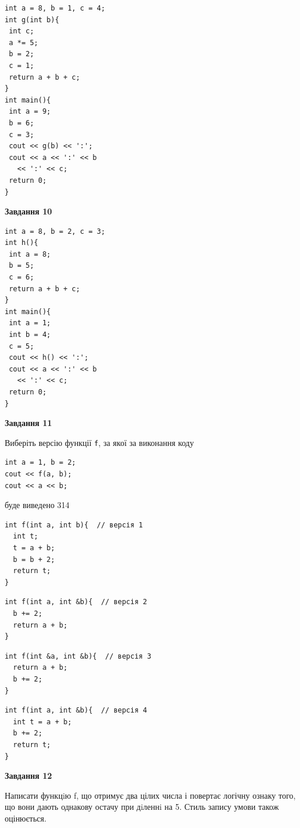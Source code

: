 \documentclass[12pt, ukrainian]{article}
\def\code#1{\Verb!#1!}
\begin{document}
{\begin {large}
\begin{minipage}[t]{7.0cm}
\begin{verbatim}
int a = 8, b = 1, c = 4;
int g(int b){
 int c;
 a *= 5;
 b = 2;
 c = 1;
 return a + b + c;
}
int main(){
 int a = 9;
 b = 6;
 c = 3;
 cout << g(b) << ':';
 cout << a << ':' << b 
   << ':' << c;
 return 0;
}
\end{verbatim}



\begin{center}
\textbf{Завдання 10}
\end{center}
\vspace{-8mm}

\begin{verbatim}
int a = 8, b = 2, c = 3;
int h(){
 int a = 8;
 b = 5;
 c = 6;
 return a + b + c;
}
int main(){
 int a = 1;
 int b = 4;
 c = 5;
 cout << h() << ':';
 cout << a << ':' << b 
   << ':' << c;
 return 0;
}
\end{verbatim}

\end{minipage}
\vline \hspace{1mm}
\begin{minipage}[t]{11.0cm}

\begin{center}
\textbf{Завдання 11}
\end{center}
Виберіть версію функції \code{f}, за якої за виконання коду
\begin{verbatim}
int a = 1, b = 2;
cout << f(a, b);
cout << a << b;
\end{verbatim}

буде виведено 314

\begin{verbatim}
int f(int a, int b){  // версія 1
  int t;
  t = a + b;
  b = b + 2;
  return t;
}
\end{verbatim}

\vspace{-8mm}\begin{verbatim}
int f(int a, int &b){  // версія 2
  b += 2;
  return a + b;
}
\end{verbatim}

\vspace{-8mm}\begin{verbatim}
int f(int &a, int &b){  // версія 3
  return a + b;
  b += 2;
}
\end{verbatim}

\vspace{-8mm}\begin{verbatim}
int f(int a, int &b){  // версія 4
  int t = a + b;
  b += 2;
  return t;
}
\end{verbatim}



\begin{center}
\textbf{Завдання 12}
\end{center}

Написати функцiю f, що отримує два цілих числа і повертає логічну ознаку того, що вони дають однакову остачу при дiленнi на 5. Стиль запису умови також оцінюється.\par

\end{minipage}

\end {large}}
\end{document}
